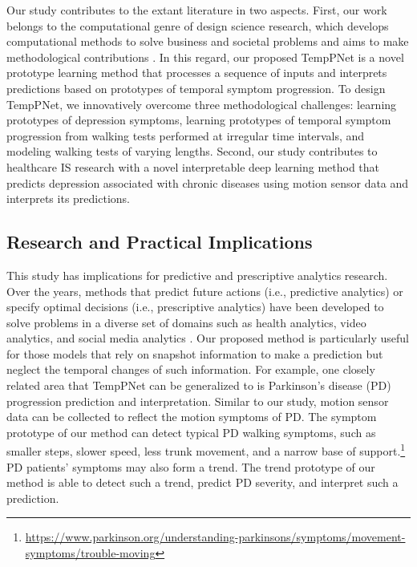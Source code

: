 \documentclass[mnsc]{informs3b} %
\begin{document}
Our study contributes to the extant literature in two aspects. First, our work belongs to the computational genre of design science research, which develops computational methods to solve business and societal problems and aims to make methodological contributions \citep{rai_editors_2017,Simchi-Levi_2020,padmanabhan_machine_2022}. In this regard, our proposed TempPNet is a novel prototype learning method that processes a sequence of inputs and interprets predictions based on prototypes of temporal symptom progression. To design TempPNet, we innovatively overcome three methodological challenges: learning prototypes of depression symptoms, learning prototypes of  temporal symptom progression from walking tests performed at irregular time intervals, and modeling walking tests of varying lengths. Second, our study contributes to healthcare IS research with a novel interpretable deep learning method that predicts depression associated with chronic diseases using motion sensor data and interprets its predictions.


\subsection{Research and Practical Implications}


This study has implications for predictive and prescriptive analytics research. Over the years, methods that predict future actions (i.e., predictive analytics) or specify optimal decisions (i.e., prescriptive analytics) have been developed to solve problems in a diverse set of domains such as health analytics, video analytics, and social media analytics \citep{xie_unbox_2020,yu_wearable_2022}.
Our proposed method is particularly useful for those models that rely on snapshot information to make a prediction but neglect the temporal changes of such information. For example, one closely related area that TempPNet can be generalized to is Parkinson's disease (PD) progression prediction and interpretation. Similar to our study, motion sensor data can be collected to reflect the motion symptoms of PD. The symptom prototype of our method can detect typical PD walking symptoms, such as smaller steps, slower speed, less trunk movement, and a narrow base of support.\footnote{\url{https://www.parkinson.org/understanding-parkinsons/symptoms/movement-symptoms/trouble-moving}} PD patients' symptoms may also form a trend. The trend prototype of our method is able to detect such a trend, predict PD severity, and interpret such a prediction.
\end{document}
